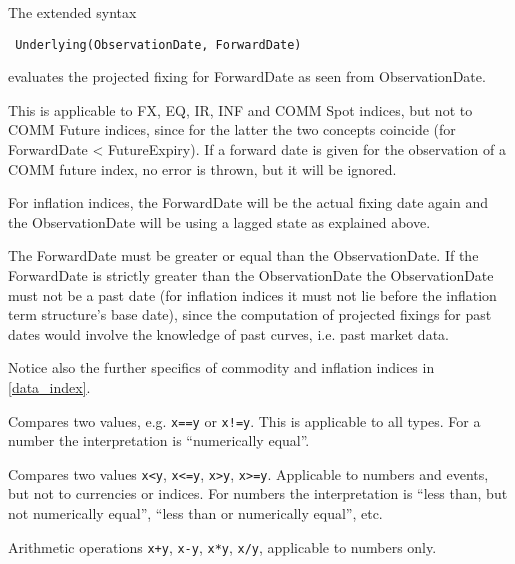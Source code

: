 The extended syntax

\begin{verbatim}
 Underlying(ObservationDate, ForwardDate)
\end{verbatim}

evaluates the projected fixing for ForwardDate as seen from ObservationDate.

This is applicable to FX, EQ, IR, INF and COMM Spot indices, but not to COMM Future indices, since for the latter the
two concepts coincide (for ForwardDate < FutureExpiry). If a forward date is given for the observation of a COMM future
index, no error is thrown, but it will be ignored.

For inflation indices, the ForwardDate will be the actual fixing date again and the ObservationDate will be using a
lagged state as explained above.

The ForwardDate must be greater or equal than the ObservationDate. If the ForwardDate is strictly greater than the
ObservationDate the ObservationDate must not be a past date (for inflation indices it must not lie before the inflation
term structure's base date), since the computation of projected fixings for past dates would involve the knowledge of
past curves, i.e. past market data.

Notice also the further specifics of commodity and inflation indices in \ref{data_index}.


Compares two values, e.g. {\tt x==y} or {\tt x!=y}. This is applicable to all types. For a number the interpretation is
``numerically equal''.


Compares two values {\tt x<y}, {\tt x<=y}, {\tt x>y}, {\tt x>=y}. Applicable to numbers and events, but not to
currencies or indices. For numbers the interpretation is ``less than, but not numerically equal'', ``less than or
numerically equal'', etc.


Arithmetic operations {\tt x+y}, {\tt x-y}, {\tt x*y}, {\tt x/y}, applicable to numbers only.

